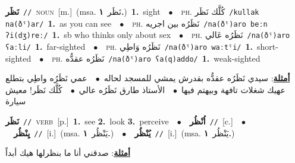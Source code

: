\documentclass[10pt,a4paper,twoside]{article} %
\begin{document}
\begin{multicols}{2}
{\setlength\topsep{0pt}\textbf{\foreignlanguage{arabic}{نَظَر}}\ {\color{gray}\texttt{//}\color{black}}\ \textsc{noun}\ [m.]\ \color{gray}(msa. \foreignlanguage{arabic}{نَظَر}~\foreignlanguage{arabic}{\textbf{١.}})\color{black}\ \textbf{1.}~sight\ \ $\bullet$\ \ \textsc{ph.} \color{gray} \foreignlanguage{arabic}{كُلَّك نَظَر}\color{black}\ {\color{gray}\texttt{/{\sffamily kullak na(ðˤ)ar}/}\color{black}}\ \textbf{1.}~as you can see\ \ $\bullet$\ \ \textsc{ph.} \color{gray} \foreignlanguage{arabic}{نَظَرُه بين اجريه}\color{black}\ {\color{gray}\texttt{/{\sffamily na(ðˤ)aro beːn ʔi(dʒ)reː}/}\color{black}}\ \textbf{1.}~sb who thinks only about sex\ \ $\bullet$\ \ \textsc{ph.} \color{gray} \foreignlanguage{arabic}{نَظَرُه عَالي}\color{black}\ {\color{gray}\texttt{/{\sffamily na(ðˤ)aro ʕaːli}/}\color{black}}\ \textbf{1.}~far-sighted\ \ $\bullet$\ \ \textsc{ph.} \color{gray} \foreignlanguage{arabic}{نَظَرُه وَاطِي}\color{black}\ {\color{gray}\texttt{/{\sffamily na(ðˤ)aro waːtˤi}/}\color{black}}\ \textbf{1.}~short-sighted\ \ $\bullet$\ \ \textsc{ph.} \color{gray} \foreignlanguage{arabic}{نَظَرُه عقدُّه}\color{black}\ {\color{gray}\texttt{/{\sffamily na(ðˤ)aro ʕa(q)addo}/}\color{black}}\ \textbf{1.}~weak-sighted\  \begin{flushright}\color{gray}\foreignlanguage{arabic}{\textbf{\underline{\foreignlanguage{arabic}{أمثلة}}}: سيدي نَظَرُه عقدُّه بقدرش يمشي للمسجد لحاله\ $\bullet$\ \  عمي نَظَرُه واطِي بتطلع عهيك شغلات تافهة وبيهتم فيها\ $\bullet$\ \  الأستاذ طارق نَظَرُه عالي\ $\bullet$\ \  كُلَّك نَظَر! معيش سيارة}\end{flushright}\color{black}} \vspace{2mm}

{\setlength\topsep{0pt}\textbf{\foreignlanguage{arabic}{نَظَر}}\ {\color{gray}\texttt{//}\color{black}}\ \textsc{verb}\ [p.]\ \textbf{1.}~see  \textbf{2.}~look  \textbf{3.}~perceive\ \ $\bullet$\ \ \setlength\topsep{0pt}\textbf{\foreignlanguage{arabic}{اُنْظُر}}\ {\color{gray}\texttt{//}\color{black}}\ [c.]\ \ $\bullet$\ \ \setlength\topsep{0pt}\textbf{\foreignlanguage{arabic}{يِنْظُر}}\ {\color{gray}\texttt{//}\color{black}}\ [i.]\ \color{gray}(msa. \foreignlanguage{arabic}{يَنْظُر}~\foreignlanguage{arabic}{\textbf{١.}})\color{black}\ \ $\bullet$\ \ \setlength\topsep{0pt}\textbf{\foreignlanguage{arabic}{يُنْظُر}}\ {\color{gray}\texttt{//}\color{black}}\ [i.]\ \color{gray}(msa. \foreignlanguage{arabic}{يَنْظُر}~\foreignlanguage{arabic}{\textbf{١.}})\color{black}\  \begin{flushright}\color{gray}\foreignlanguage{arabic}{\textbf{\underline{\foreignlanguage{arabic}{أمثلة}}}: صدقني أنا ما بنظرلها هيك أبداً}\end{flushright}\color{black}} \vspace{2mm}


\end{multicols}
\end{document}

